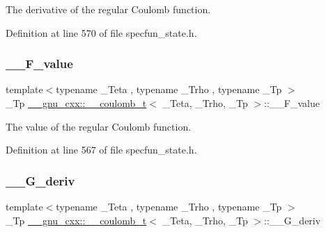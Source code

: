 The derivative of the regular Coulomb function. 



Definition at line 570 of file specfun\+\_\+state.\+h.

\mbox{\label{struct____gnu__cxx_1_1____coulomb__t_af246b9d73035a2c8aa04038b813610de}} 
\subsubsection{\texorpdfstring{\+\_\+\+\_\+\+F\+\_\+value}{\_\_F\_value}}
{\footnotesize\ttfamily template$<$typename \+\_\+\+Teta , typename \+\_\+\+Trho , typename \+\_\+\+Tp $>$ \\
\+\_\+\+Tp \hyperlink{struct____gnu__cxx_1_1____coulomb__t}{\+\_\+\+\_\+gnu\+\_\+cxx\+::\+\_\+\+\_\+coulomb\+\_\+t}$<$ \+\_\+\+Teta, \+\_\+\+Trho, \+\_\+\+Tp $>$\+::\+\_\+\+\_\+\+F\+\_\+value}



The value of the regular Coulomb function. 



Definition at line 567 of file specfun\+\_\+state.\+h.

\mbox{\label{struct____gnu__cxx_1_1____coulomb__t_a806017e10d24a36b075d1c0c074bc274}} 
\subsubsection{\texorpdfstring{\+\_\+\+\_\+\+G\+\_\+deriv}{\_\_G\_deriv}}
{\footnotesize\ttfamily template$<$typename \+\_\+\+Teta , typename \+\_\+\+Trho , typename \+\_\+\+Tp $>$ \\
\+\_\+\+Tp \hyperlink{struct____gnu__cxx_1_1____coulomb__t}{\+\_\+\+\_\+gnu\+\_\+cxx\+::\+\_\+\+\_\+coulomb\+\_\+t}$<$ \+\_\+\+Teta, \+\_\+\+Trho, \+\_\+\+Tp $>$\+::\+\_\+\+\_\+\+G\+\_\+deriv}




